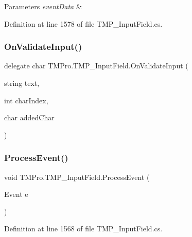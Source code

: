 \begin{DoxyParams}{Parameters}
{\em event\+Data} & \\
\hline
\end{DoxyParams}


Definition at line 1578 of file T\+M\+P\+\_\+\+Input\+Field.\+cs.

\mbox{\label{class_t_m_pro_1_1_t_m_p___input_field_a34dece90fcdb81bf3489208eab7a8a82}} 
\subsubsection{\texorpdfstring{OnValidateInput()}{OnValidateInput()}}
{\footnotesize\ttfamily delegate char T\+M\+Pro.\+T\+M\+P\+\_\+\+Input\+Field.\+On\+Validate\+Input (\begin{DoxyParamCaption}\item[{string}]{text,  }\item[{int}]{char\+Index,  }\item[{char}]{added\+Char }\end{DoxyParamCaption})}

\mbox{\label{class_t_m_pro_1_1_t_m_p___input_field_abdbb932fc8d6aa12272b0a480ad13504}} 
\subsubsection{\texorpdfstring{ProcessEvent()}{ProcessEvent()}}
{\footnotesize\ttfamily void T\+M\+Pro.\+T\+M\+P\+\_\+\+Input\+Field.\+Process\+Event (\begin{DoxyParamCaption}\item[{Event}]{e }\end{DoxyParamCaption})}



Definition at line 1568 of file T\+M\+P\+\_\+\+Input\+Field.\+cs.

\mbox{\label{class_t_m_pro_1_1_t_m_p___input_field_acb2dc09ce7a2a0ccda89e917a23d35f3}} 
